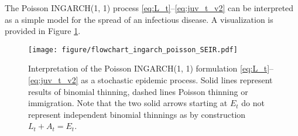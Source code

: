 \documentclass{article}
\begin{document}
The Poisson INGARCH(1, 1) process \eqref{eq:L_t}--\eqref{eq:juv_t_v2} can be interpreted as a simple model for the spread of an infectious disease. A visualization is provided in Figure \ref{fig:ingarch_flowchart_poisson}.

\begin{figure}
\center
\texttt{[image: figure/flowchart\_ingarch\_poisson\_SEIR.pdf]}
\caption{Interpretation of the Poisson INGARCH(1, 1) formulation \eqref{eq:L_t}--\eqref{eq:juv_t_v2} as a stochastic epidemic process. Solid lines represent results of binomial thinning, dashed lines Poisson thinning or immigration. Note that the two solid arrows starting at $E_t$ do not represent independent binomial thinnings as by construction  $L_t + A_t = E_t$.}
\label{fig:ingarch_flowchart_poisson}
\end{figure}
\end{document}

